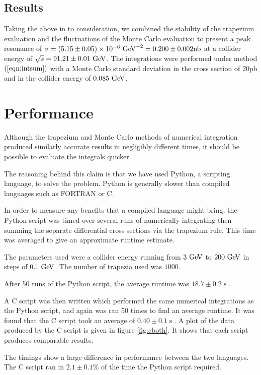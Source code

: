\documentclass[]{article}
\providecommand{\e}[1]{\ensuremath{\times 10^{#1}}}
\begin{document}
\subsection{Results}\label{ssec:results}


Taking the above in to consideration, we combined the stability of the trapezium evaluation and the fluctuations of  the Monte Carlo evaluation to present a peak resonance of $\sigma=(5.15\pm0.05)\e{-6}\GeV^{-2}=0.200\pm0.002\mathrm{nb}$ at a collider energy of $\sqrt{s}=91.21\pm0.01\GeV$. The integrations were performed under method $(\ref{eqn:intsum})$ with a Monte Carlo standard deviation in the cross section of $20\mathrm{pb}$ and in the collider energy of $0.085\GeV$.

\section{Performance}\label{sec:performance}

Although the trapezium and Monte Carlo methods of numerical integration produced similarly accurate results in negligibly different times, it should be possible to evaluate the integrals quicker.

The reasoning behind this claim is that we have used Python, a scripting language, to solve the problem. Python is generally slower than compiled languages such as FORTRAN or C.

In order to measure any benefits that a compiled language might bring, the Python script was timed over several runs of numerically integrating then summing the separate differential cross sections via the trapezium rule. This time was averaged to give an approximate runtime estimate.

The parameters used were a collider energy running from $3\GeV$ to $200\GeV$ in steps of $0.1\GeV$. The number of trapezia used was $1000$.

After 50 runs of the Python script, the average runtime was $18.7 \pm 0.2 \operatorname{s}$.

A C script was then written which performed the same numerical integrations as the Python script, and again was ran 50 times to find an average runtime. It was found that the C script took an average of $0.40 \pm 0.1 \operatorname{s}$. A plot of the data produced by the C script is given in figure \ref{fig:cboth}. It shows that each script produces comparable results.

The timings show a large difference in performance between the two languages. The C script ran in $2.1\pm0.1\%$ of the time the Python script required.
\end{document}
